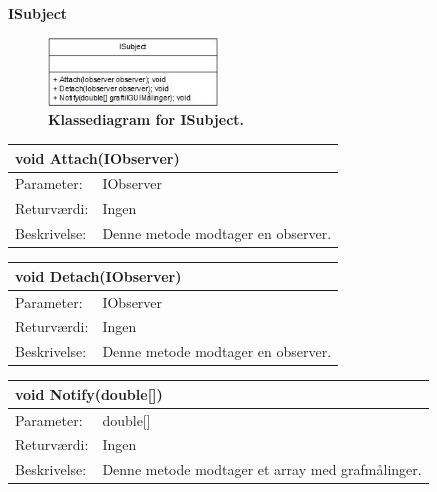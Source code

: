 \textbf{ISubject}
\begin{figure}[H]
\includegraphics[width =0.4\textwidth , center]{billeder/klassediagramIsubject}
\caption{\textbf{Klassediagram for ISubject.}}
\end{figure}
\begin{table}[H]
\label{tab:tabel2}
\begin{tabular}{| l | p{13cm} |}
   \hline
   \multicolumn{2}{|l|}{void Attach(IObserver)} \\ \hline
   Parameter: & IObserver\\ \hline
   Returværdi: & Ingen \\ \hline
   Beskrivelse: & Denne metode modtager en observer.\\ \hline
\end{tabular}
\end{table}
\begin{table}[H]
\label{tab:tabel2}
\begin{tabular}{| l | p{13cm} |}
   \hline
   \multicolumn{2}{|l|}{void Detach(IObserver)} \\ \hline
   Parameter: & IObserver\\ \hline
   Returværdi: & Ingen \\ \hline
   Beskrivelse: & Denne metode modtager en observer.\\ \hline
\end{tabular}
\end{table}
\begin{table}[H]
\label{tab:tabel2}
\begin{tabular}{| l | p{13cm} |}
   \hline
   \multicolumn{2}{|l|}{void Notify(double[])} \\ \hline
   Parameter: & double[]\\ \hline
   Returværdi: & Ingen \\ \hline
   Beskrivelse: & Denne metode modtager et array med grafmålinger.\\ \hline
\end{tabular}
\end{table}


